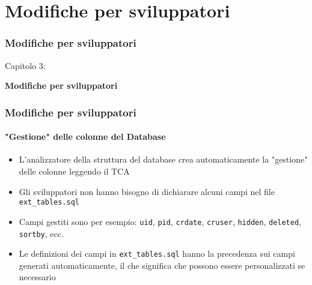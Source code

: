 %

\section{Modifiche per sviluppatori}
\begin{frame}[fragile]
	\frametitle{Modifiche per sviluppatori}

	\begin{center}\huge{Capitolo 3:}\end{center}
	\begin{center}\huge{\color{typo3darkgrey}\textbf{Modifiche per sviluppatori}}\end{center}

\end{frame}


\begin{frame}[fragile]
	\frametitle{Modifiche per sviluppatori}
	\framesubtitle{"Gestione" delle colonne del Database}

	\begin{itemize}
		\item L'analizzatore della struttura del database crea automaticamente la "gestione" 
			delle colonne leggendo il TCA
		\item Gli sviluppatori non hanno bisogno di dichiarare alcuni campi nel file
			\texttt{ext\_tables.sql}
		\item Campi gestiti sono per esempio:\newline
			\texttt{uid}, \texttt{pid}, \texttt{crdate}, \texttt{cruser},
			\texttt{hidden}, \texttt{deleted}, \texttt{sortby}, ecc.
		\item Le definizioni dei campi in \texttt{ext\_tables.sql} hanno la precedenza
			sui campi generati automaticamente, il che significa che possono essere personalizzati
			se necessario
	\end{itemize}

\end{frame}


